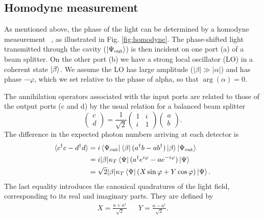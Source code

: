 \subsection{Homodyne measurement}

As mentioned above, the phase of the light can be determined by a homodyne
measurement ~\cite{agarwal2012}, as illustrated in Fig.
\ref{fig:homodyne}.
The phase-shifted light transmitted through the cavity
($\ket{\Psi_\text{out}}$)
is then incident on one port (a) of a
beam splitter. On the other port (b) we have a strong local oscillator (LO) in a
coherent state $\ket{\beta}$. We assume the LO has large amplitude ($|\beta|
\gg |\alpha|$) and has phase $-\varphi$, which we set relative to the phase of
alpha, so that $\arg(\alpha)=0$.

The annihilation operators associated with the
input ports are related to those of the output ports (c and d) by the usual
relation for a balanced beam splitter~\cite{agarwal2012}
%
\begin{equation}
  \begin{pmatrix} c \\ d \end{pmatrix} = \frac{1}{\sqrt{2}}\begin{pmatrix}
    1 & i \\ i & 1 
  \end{pmatrix}  \begin{pmatrix} a \\ b \end{pmatrix}.
\end{equation}
%
The difference in the expected photon numbers arriving at each
detector is
%
\begin{align}
  \langle c^\dagger c - d^\dagger d\rangle &= i
  \bra{\Psi_\text{out}}\bra{\beta}(a^\dagger b-
  ab^\dagger)\ket{\beta}\ket{\Psi_\text{out}} \\
  & = i|\beta|\kappa_T \bra{\Psi}(a^\dagger e^{i\varphi} - a
  e^{-i\varphi})\ket{\Psi} \\
  &= \sqrt{2}|\beta|\kappa_T\bra{\Psi}(X\sin\varphi +
  Y\cos\varphi)\ket{\Psi}.
\end{align}
%
The last equality introduces the canonical quadratures of the light field,
corresponding to its real and imaginary parts. They are defined by
%
\begin{align}
  X = \frac{a + a^\dagger}{\sqrt{2}} && Y = \frac{a - a^\dagger}{\sqrt{2}}.
\end{align}


